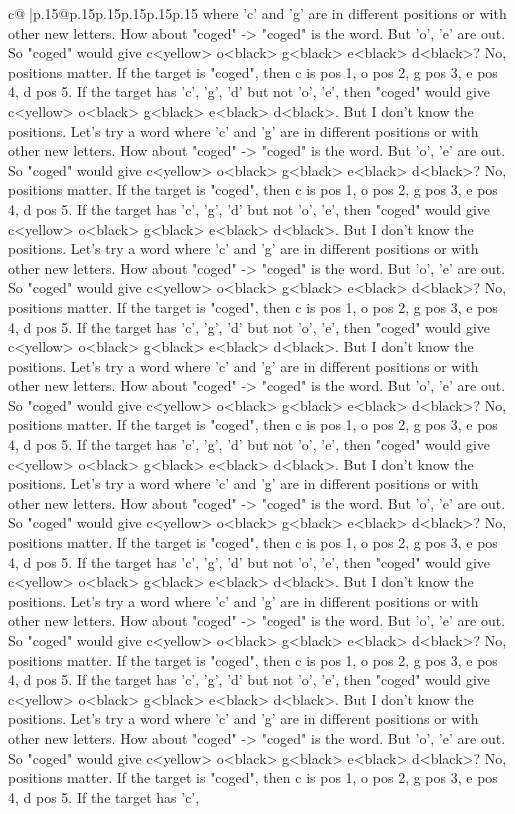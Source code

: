 \documentclass{article}
\begin{document}
{\begin{supertabular}{c@{$\;$}|p{.15\linewidth}@{}p{.15\linewidth}p{.15\linewidth}p{.15\linewidth}p{.15\linewidth}p{.15\linewidth}}
{{{where 'c' and 'g' are in different positions or with other new letters. How about "coged" {-}> "coged" is the word. But 'o', 'e' are out. So "coged" would give c<yellow> o<black> g<black> e<black> d<black>? No, positions matter. If the target is "coged", then c is pos 1, o pos 2, g pos 3, e pos 4, d pos 5. If the target has 'c', 'g', 'd' but not 'o', 'e', then "coged" would give c<yellow> o<black> g<black> e<black> d<black>. But I don't know the positions. Let's try a word where 'c' and 'g' are in different positions or with other new letters. How about "coged" {-}> "coged" is the word. But 'o', 'e' are out. So "coged" would give c<yellow> o<black> g<black> e<black> d<black>? No, positions matter. If the target is "coged", then c is pos 1, o pos 2, g pos 3, e pos 4, d pos 5. If the target has 'c', 'g', 'd' but not 'o', 'e', then "coged" would give c<yellow> o<black> g<black> e<black> d<black>. But I don't know the positions. Let's try a word where 'c' and 'g' are in different positions or with other new letters. How about "coged" {-}> "coged" is the word. But 'o', 'e' are out. So "coged" would give c<yellow> o<black> g<black> e<black> d<black>? No, positions matter. If the target is "coged", then c is pos 1, o pos 2, g pos 3, e pos 4, d pos 5. If the target has 'c', 'g', 'd' but not 'o', 'e', then "coged" would give c<yellow> o<black> g<black> e<black> d<black>. But I don't know the positions. Let's try a word where 'c' and 'g' are in different positions or with other new letters. How about "coged" {-}> "coged" is the word. But 'o', 'e' are out. So "coged" would give c<yellow> o<black> g<black> e<black> d<black>? No, positions matter. If the target is "coged", then c is pos 1, o pos 2, g pos 3, e pos 4, d pos 5. If the target has 'c', 'g', 'd' but not 'o', 'e', then "coged" would give c<yellow> o<black> g<black> e<black> d<black>. But I don't know the positions. Let's try a word where 'c' and 'g' are in different positions or with other new letters. How about "coged" {-}> "coged" is the word. But 'o', 'e' are out. So "coged" would give c<yellow> o<black> g<black> e<black> d<black>? No, positions matter. If the target is "coged", then c is pos 1, o pos 2, g pos 3, e pos 4, d pos 5. If the target has 'c', 'g', 'd' but not 'o', 'e', then "coged" would give c<yellow> o<black> g<black> e<black> d<black>. But I don't know the positions. Let's try a word where 'c' and 'g' are in different positions or with other new letters. How about "coged" {-}> "coged" is the word. But 'o', 'e' are out. So "coged" would give c<yellow> o<black> g<black> e<black> d<black>? No, positions matter. If the target is "coged", then c is pos 1, o pos 2, g pos 3, e pos 4, d pos 5. If the target has 'c', 'g', 'd' but not 'o', 'e', then "coged" would give c<yellow> o<black> g<black> e<black> d<black>. But I don't know the positions. Let's try a word where 'c' and 'g' are in different positions or with other new letters. How about "coged" {-}> "coged" is the word. But 'o', 'e' are out. So "coged" would give c<yellow> o<black> g<black> e<black> d<black>? No, positions matter. If the target is "coged", then c is pos 1, o pos 2, g pos 3, e pos 4, d pos 5. If the target has 'c', }}}
\end{supertabular}}
\end{document}
